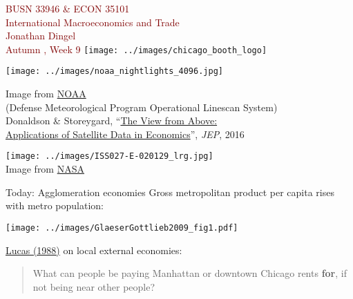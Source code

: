 \documentclass[10pt,notes=hide]{beamer}
\begin{document}
\begin{frame}[plain]
\begin{center}
\large
\textcolor{maroon}{BUSN 33946 \& ECON 35101\\
International Macroeconomics and Trade\\ 
Jonathan Dingel\\
Autumn \the\year, Week 9}
\vfill 
\texttt{[image: ../images/chicago\_booth\_logo]}
\end{center}
\end{frame}
\begin{frame}[plain]
\begin{center}
\texttt{[image: ../images/noaa\_nightlights\_4096.jpg]} \\
{\small
Image from \href{ftp://public.sos.noaa.gov/land/earth_night/nightlights/4096.jpg}{NOAA} \\
(Defense Meteorological Program Operational Linescan System)\\
Donaldson \& Storeygard, ``\href{https://www.aeaweb.org/articles?id=10.1257/jep.30.4.171}{The View from Above: \\ Applications of Satellite Data in Economics}'', \textit{JEP}, 2016
\par}
\end{center}
\end{frame}
\begin{frame}[plain]
\begin{center}
\texttt{[image: ../images/ISS027-E-020129\_lrg.jpg]} \\
Image from \href{https://visibleearth.nasa.gov/view.php?id=50671
}{NASA}
\end{center}
\end{frame}
\begin{frame}{Today: Agglomeration economies}
Gross metropolitan product per capita rises with metro population:
\begin{center}
\texttt{[image: ../images/GlaeserGottlieb2009\_fig1.pdf]}
\end{center}
\href{https://www.sciencedirect.com/science/article/pii/0304393288901687}{Lucas (1988)} on local external economies:
\begin{quote}
What can people be paying Manhattan or downtown Chicago rents \textbf{for}, if not being near other people?\par
\end{quote}
\end{frame}
\end{document}
